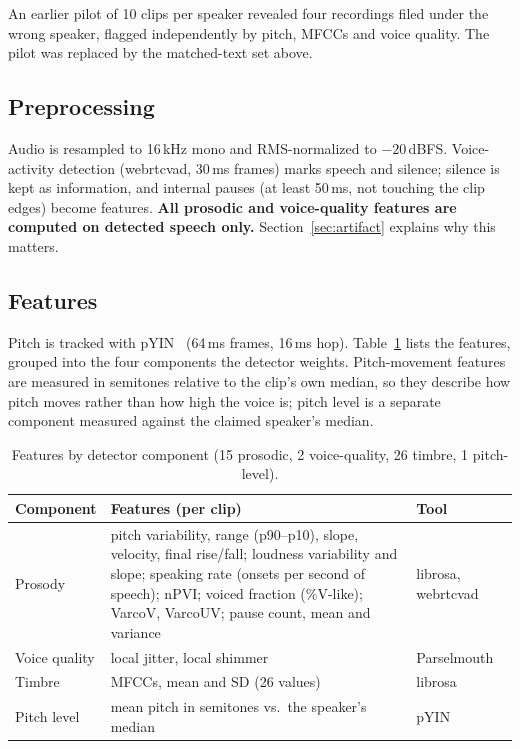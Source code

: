\documentclass[11pt,a4paper]{article}
\begin{document}
An earlier pilot of 10 clips per speaker revealed four recordings filed under the wrong speaker, flagged independently by pitch, MFCCs and voice quality. The pilot was replaced by the matched-text set above.

\subsection{Preprocessing}
Audio is resampled to 16\,kHz mono and RMS-normalized to $-20$\,dBFS. Voice-activity detection (webrtcvad, 30\,ms frames) marks speech and silence; silence is kept as information, and internal pauses (at least 50\,ms, not touching the clip edges) become features. \textbf{All prosodic and voice-quality features are computed on detected speech only.} Section~\ref{sec:artifact} explains why this matters.

\subsection{Features}
Pitch is tracked with pYIN~\cite{pyin} (64\,ms frames, 16\,ms hop). Table~\ref{tab:features} lists the features, grouped into the four components the detector weights. Pitch-movement features are measured in semitones relative to the clip's own median, so they describe how pitch moves rather than how high the voice is; pitch level is a separate component measured against the claimed speaker's median.

\begin{table}[h]
\centering\small
\begin{tabularx}{\linewidth}{@{}l>{\raggedright\arraybackslash}Xl@{}}
\toprule
Component & Features (per clip) & Tool\\
\midrule
Prosody & pitch variability, range (p90--p10), slope, velocity, final rise/fall; loudness variability and slope; speaking rate (onsets per second of speech); nPVI; voiced fraction (\%V-like); VarcoV, VarcoUV; pause count, mean and variance & librosa, webrtcvad\\
Voice quality & local jitter, local shimmer & Parselmouth~\cite{parselmouth}\\
Timbre & 13 MFCCs, mean and SD (26 values) & librosa~\cite{librosa}\\
Pitch level & mean pitch in semitones vs.\ the speaker's median & pYIN\\
\bottomrule
\end{tabularx}
\caption{Features by detector component (15 prosodic, 2 voice-quality, 26 timbre, 1 pitch-level).}
\label{tab:features}
\end{table}
\end{document}
